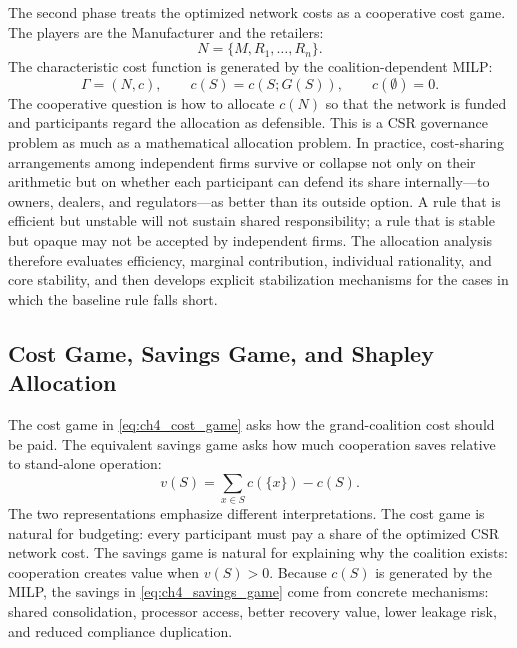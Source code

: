 The second phase treats the optimized network costs as a cooperative cost game. The players are the Manufacturer and the retailers:
\begin{equation*}
N=\{M,R_1,\ldots,R_n\}.
\end{equation*}
The characteristic cost function is generated by the coalition-dependent MILP:
\begin{equation}
\label{eq:ch4_cost_game}
\Gamma=(N,c),
\qquad
c(S)=c(S;G(S)),
\qquad
c(\emptyset)=0.
\end{equation}
The cooperative question is how to allocate $c(N)$ so that the network is funded and participants regard the allocation as defensible. This is a CSR governance problem as much as a mathematical allocation problem. In practice, cost-sharing arrangements among independent firms survive or collapse not only on their arithmetic but on whether each participant can defend its share internally---to owners, dealers, and regulators---as better than its outside option. A rule that is efficient but unstable will not sustain shared responsibility; a rule that is stable but opaque may not be accepted by independent firms. The allocation analysis therefore evaluates efficiency, marginal contribution, individual rationality, and core stability, and then develops explicit stabilization mechanisms for the cases in which the baseline rule falls short.

\subsection{Cost Game, Savings Game, and Shapley Allocation}

The cost game in \eqref{eq:ch4_cost_game} asks how the grand-coalition cost should be paid. The equivalent savings game asks how much cooperation saves relative to stand-alone operation:
\begin{equation}
\label{eq:ch4_savings_game}
v(S)=\sum_{x\in S}c(\{x\})-c(S).
\end{equation}
The two representations emphasize different interpretations. The cost game is natural for budgeting: every participant must pay a share of the optimized CSR network cost. The savings game is natural for explaining why the coalition exists: cooperation creates value when $v(S)>0$. Because $c(S)$ is generated by the MILP, the savings in \eqref{eq:ch4_savings_game} come from concrete mechanisms: shared consolidation, processor access, better recovery value, lower leakage risk, and reduced compliance duplication.

